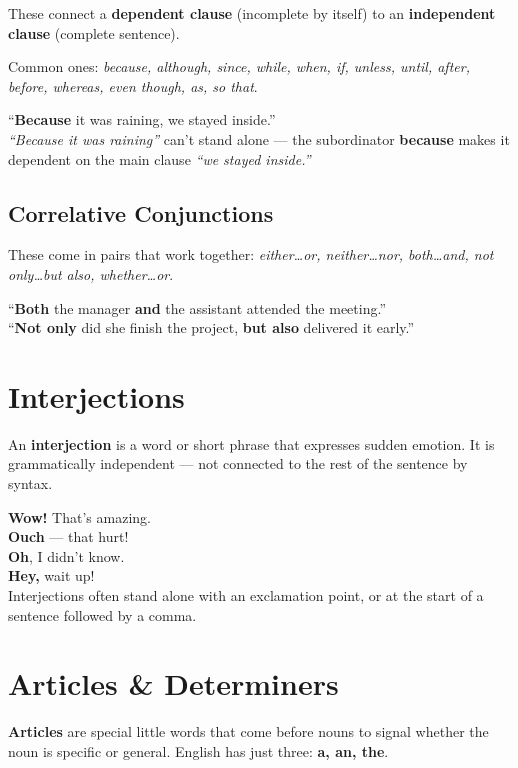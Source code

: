 \documentclass[11pt, letterpaper]{article}
\newcommand{\example}[1]{%
  \begin{tcolorbox}[colback=exbg, colframe=exborder,
    title={\bfseries Example}, arc=3pt, boxrule=1pt]
  #1
  \end{tcolorbox}%
}
\begin{document}
These connect a \textbf{dependent clause} (incomplete by itself) to an \textbf{independent
clause} (complete sentence).

Common ones: \emph{because, although, since, while, when, if, unless, until, after, before,
whereas, even though, as, so that}.

\example{
``\textbf{Because} it was raining, we stayed inside.''\\
\emph{``Because it was raining''} can't stand alone --- the subordinator \textbf{because} makes it dependent on the main clause \emph{``we stayed inside.''}
}

\subsection*{Correlative Conjunctions}

These come in pairs that work together: \emph{either\ldots or, neither\ldots nor, both\ldots and,
not only\ldots but also, whether\ldots or}.

\example{
``\textbf{Both} the manager \textbf{and} the assistant attended the meeting.''\\
``\textbf{Not only} did she finish the project, \textbf{but also} delivered it early.''
}

\section*{Interjections}

An \textbf{interjection} is a word or short phrase that expresses sudden emotion. It is
grammatically independent --- not connected to the rest of the sentence by syntax.

\example{
\textbf{Wow!} That's amazing.\\
\textbf{Ouch} --- that hurt!\\
\textbf{Oh}, I didn't know.\\
\textbf{Hey,} wait up!\\[4pt]
Interjections often stand alone with an exclamation point, or at the start of a sentence
followed by a comma.
}

\section*{Articles \& Determiners}

\textbf{Articles} are special little words that come before nouns to signal whether the noun
is specific or general. English has just three: \textbf{a, an, the}.
\end{document}
